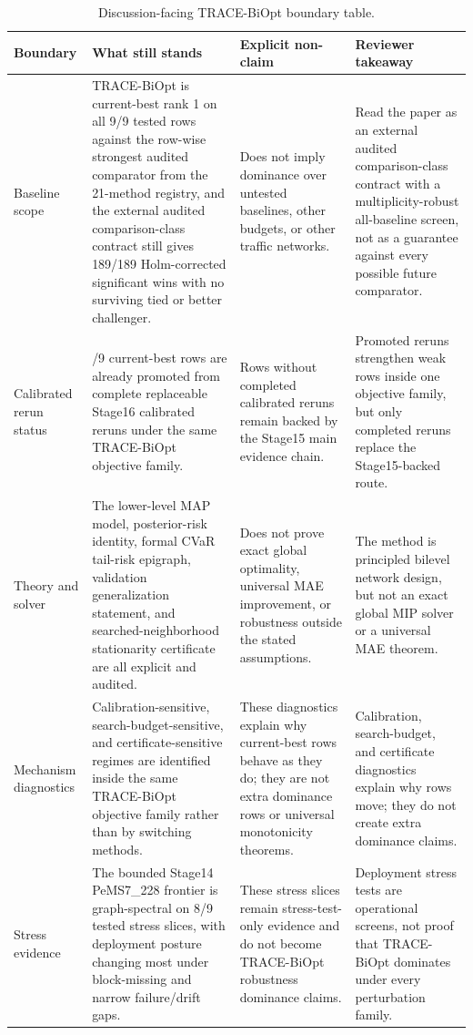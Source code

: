 \begin{table}[pos=htbp]
\centering
\caption{Discussion-facing TRACE-BiOpt boundary table.}
\label{tab:trace-biopt-discussion-boundary}
\scriptsize
\setlength{\tabcolsep}{4pt}
\begin{tabularx}{\textwidth}{>{\raggedright\arraybackslash}p{}>{\raggedright\arraybackslash}p{}>{\raggedright\arraybackslash}p{}>{\raggedright\arraybackslash}X}
\toprule
Boundary & What still stands & Explicit non-claim & Reviewer takeaway \\
\midrule
Baseline scope & TRACE-BiOpt is current-best rank 1 on all 9/9 tested rows against the row-wise strongest audited comparator from the 21-method registry, and the external audited comparison-class contract still gives 189/189 Holm-corrected significant wins with no surviving tied or better challenger. & Does not imply dominance over untested baselines, other budgets, or other traffic networks. & Read the paper as an external audited comparison-class contract with a multiplicity-robust all-baseline screen, not as a guarantee against every possible future comparator. \\
Calibrated rerun status & 8/9 current-best rows are already promoted from complete replaceable Stage16 calibrated reruns under the same TRACE-BiOpt objective family. & Rows without completed calibrated reruns remain backed by the Stage15 main evidence chain. & Promoted reruns strengthen weak rows inside one objective family, but only completed reruns replace the Stage15-backed route. \\
Theory and solver & The lower-level MAP model, posterior-risk identity, formal CVaR tail-risk epigraph, validation generalization statement, and searched-neighborhood stationarity certificate are all explicit and audited. & Does not prove exact global optimality, universal MAE improvement, or robustness outside the stated assumptions. & The method is principled bilevel network design, but not an exact global MIP solver or a universal MAE theorem. \\
Mechanism diagnostics & Calibration-sensitive, search-budget-sensitive, and certificate-sensitive regimes are identified inside the same TRACE-BiOpt objective family rather than by switching methods. & These diagnostics explain why current-best rows behave as they do; they are not extra dominance rows or universal monotonicity theorems. & Calibration, search-budget, and certificate diagnostics explain why rows move; they do not create extra dominance claims. \\
Stress evidence & The bounded Stage14 PeMS7\_228 frontier is graph-spectral on 8/9 tested stress slices, with deployment posture changing most under block-missing and narrow failure/drift gaps. & These stress slices remain stress-test-only evidence and do not become TRACE-BiOpt robustness dominance claims. & Deployment stress tests are operational screens, not proof that TRACE-BiOpt dominates under every perturbation family. \\
\bottomrule
\end{tabularx}
\end{table}
